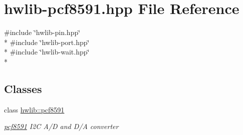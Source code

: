 \hypertarget{hwlib-pcf8591_8hpp}{}\section{hwlib-\/pcf8591.hpp File Reference}
\label{hwlib-pcf8591_8hpp}
{\ttfamily \#include \char`\"{}hwlib-\/pin.\+hpp\char`\"{}}\\*
{\ttfamily \#include \char`\"{}hwlib-\/port.\+hpp\char`\"{}}\\*
{\ttfamily \#include \char`\"{}hwlib-\/wait.\+hpp\char`\"{}}\\*
\subsection*{Classes}
\begin{DoxyCompactItemize}
\item 
class \hyperlink{classhwlib_1_1pcf8591}{hwlib\+::pcf8591}
\begin{DoxyCompactList}\small\item\em \hyperlink{classhwlib_1_1pcf8591}{pcf8591} I2C A/D and D/A converter \end{DoxyCompactList}\end{DoxyCompactItemize}
